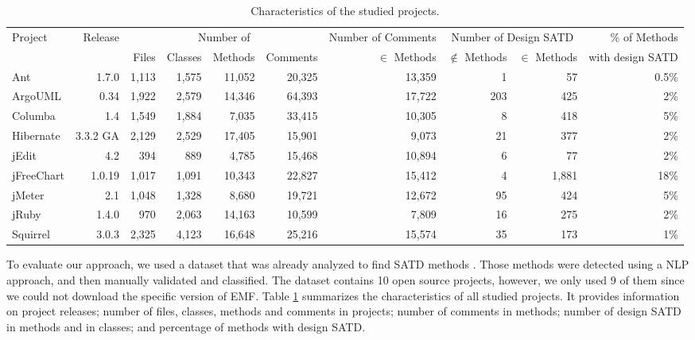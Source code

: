 \begin{landscape}
\begin{table}[t]
	\caption{Characteristics of the studied projects.}
	\label{tab:projects}
	\centering
		\begin{adjustbox}{center}
			\begin{tabular}{l r | r r r r | r | r r | r}
				\hline
				\multirow{2}{*}{Project} & \multirow{2}{*}{Release} &\multicolumn{4}{c|}{Number of} &\multicolumn{1}{c|}{Number of Comments}
				&\multicolumn{2}{c|}{Number of Design SATD} & \% of Methods\\
				&& Files& Classes& Methods& Comments                      & $\in$ Methods& $\notin$ Methods & $\in$ Methods & with design SATD\\
				\hline
				Ant&1.7.0 & 1,113 & 1,575 & 11,052 & 20,325               & 13,359        &  1 & 57 & 0.5\% \\
				ArgoUML&0.34& 1,922 & 2,579 & 14,346 & 64,393       &  17,722       & 203 & 425  & 2\%\\
				Columba&1.4& 1,549 & 1,884 & 7,035 & 33,415           & 10,305        & 8 & 418 & 5\%  \\
				Hibernate&3.3.2 GA & 2,129 & 2,529 & 17,405 & 15,901 & 9,073        & 21  &  377  &  2\%\\
				jEdit & 4.2 & 394 & 889 & 4,785 & 15,468                     &10,894         & 6  & 77  & 2\% \\
				jFreeChart&1.0.19 & 1,017 & 1,091 & 10,343 & 22,827  & 15,412       &  4  & 1,881  & 18\%\\
				jMeter&2.1& 1,048 & 1,328 & 8,680 & 19,721                &  12,672      & 95 &  424 & 5\%  \\
				jRuby&1.4.0 & 970 & 2,063 & 14,163 & 10,599               & 7,809        & 16   & 275  &  2\%\\
				Squirrel&3.0.3 & 2,325 & 4,123 & 16,648 & 25,216         & 15,574      &35  & 173  & 1\%\\
				\hline
			\end{tabular}
		\end{adjustbox}
		\vspace{-4mm}
\end{table}
\end{landscape}

To evaluate our approach, we used a dataset that was already analyzed to find \ac{SATD} methods \citep{maldonado17}. Those methods were detected using a NLP approach, and then manually validated and classified. The dataset contains 10 open source projects, however, we only used 9 of them since we could not download the specific version of EMF. Table \ref{tab:projects} summarizes the characteristics of all studied projects. It provides information on project releases; number of files, classes, methods and comments in projects; number of comments in methods; number of design \ac{SATD} in methods and in classes; and percentage of methods with design \ac{SATD}. \par

